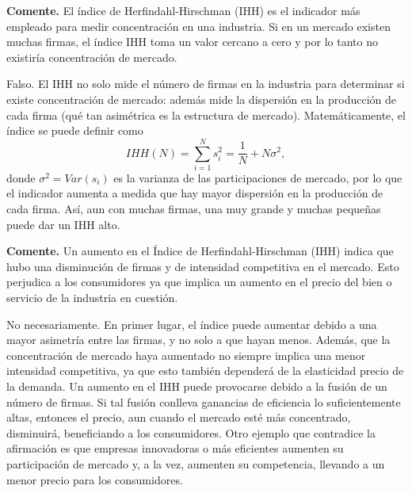 \question \textbf{Comente.} El índice de Herfindahl-Hirschman (IHH) es el indicador más empleado para medir concentración en una industria. Si en un mercado existen muchas firmas, el índice IHH toma un valor cercano a cero y por lo tanto no existiría concentración de mercado.
\begin{solution}
Falso. El IHH no solo mide el número de firmas en la industria para determinar si existe concentración de mercado: además mide la dispersión en la producción de cada firma (qué tan asimétrica es la estructura de mercado). Matemáticamente, el índice se puede definir como
\[
  IHH(N) = \sum_{i=1}^{N}s_i^2 = \frac{1}{N} + N\sigma^2,
\]
donde $\sigma^2 = Var(s_i)$ es la varianza de las participaciones de mercado, por lo que el indicador aumenta a medida que hay mayor dispersión en la producción de cada firma. Así, aun con muchas firmas, una muy grande y muchas pequeñas puede dar un IHH alto.

\end{solution}

\question \textbf{Comente.} Un aumento en el Índice de Herfindahl-Hirschman (IHH) indica que hubo una disminución de firmas y de intensidad competitiva en el mercado. Esto perjudica a los consumidores ya que implica un aumento en el precio del bien o servicio de la industria en cuestión.
\begin{solution}
No necesariamente. En primer lugar, el índice puede aumentar debido a una mayor asimetría entre las firmas, y no solo a que hayan menos. Además, que la concentración de mercado haya aumentado no siempre implica una menor intensidad competitiva, ya que esto también dependerá de la elasticidad precio de la demanda. Un aumento en el IHH puede provocarse debido a la fusión de un número de firmas. Si tal fusión conlleva ganancias de eficiencia lo suficientemente altas, entonces el precio, aun cuando el mercado esté más concentrado, disminuirá, beneficiando a los consumidores. Otro ejemplo que contradice la afirmación es que empresas innovadoras o más eficientes aumenten su participación de mercado y, a la vez, aumenten su competencia, llevando a un menor precio para los consumidores.

\end{solution}

